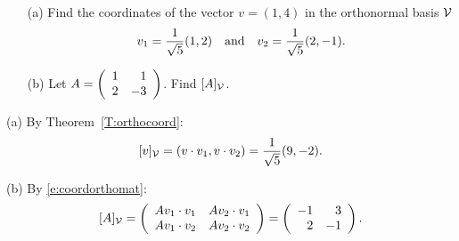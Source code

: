 \documentclass{ximera}
\begin{document}
\begin{exercise} \label{c7.4.2}
\begin{itemize}
\item[(a)] Find the coordinates of the vector $v=(1,4)$ in the orthonormal
basis ${\cal V}$
\[
v_1 = \frac{1}{\sqrt{5}}(1,2) \quad\mbox{and}\quad v_2 = \frac{1}{\sqrt{5}}(2,-1).
\]
\item[(b)]  Let $A=\left(\begin{array}{rr} 1 & 1\\ 2 &-3\end{array}\right)$. Find $[A]_{\cal V}$.
\end{itemize}

\begin{solution}

(a) By Theorem~\ref{T:orthocoord}:
\[
[v]_{\cal V} = (v \cdot v_1, v \cdot v_2) = 
\frac{1}{\sqrt{5}}(9,-2).
\]

(b) By \eqref{e:coordorthomat}:
\[ [A]_{\cal V} = \left(\begin{array}{rr} Av_1 \cdot v_1 & Av_2 \cdot v_1\\ Av_1 \cdot v_2 &Av_2 \cdot v_2\end{array}\right) = \left(\begin{array}{rr} -1 & 3\\ 2 &-1\end{array}\right). \]

\end{solution}
\end{exercise}
\end{document}
